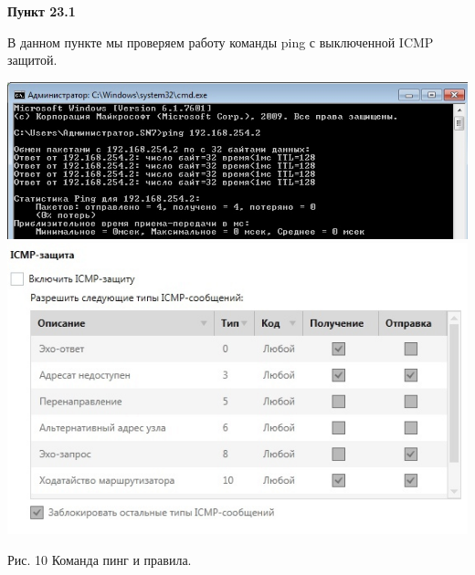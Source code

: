 \documentclass[a4paper,14pt]{extarticle}
\begin{document}
    \textbf{Пункт 23.1}
    \vspace{-3ex}
    \begin{center}
        \singlespacing
        В данном пункте мы проверяем работу команды ping с выключенной ICMP защитой.

        \begin{multicols}{2}
            \includegraphics[scale=0.4]{pics/23.1_1.jpg}
            \includegraphics[scale=0.4]{pics/23.1_2.jpg}
        \end{multicols}

        Рис. 10 Команда пинг и правила.
    \end{center}
\end{document}
